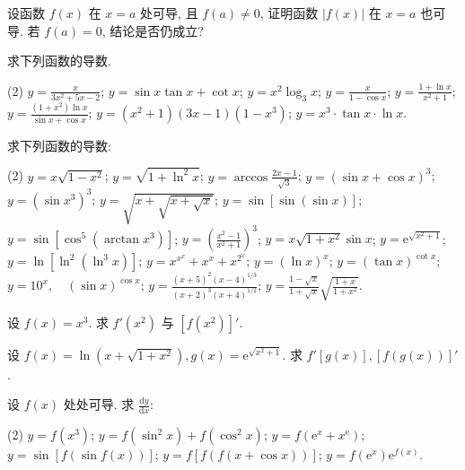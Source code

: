 \begin{exercise}[3.1.5]
    设函数 $f(x)$ 在 $x=a$ 处可导, 且 $f(a) \ne 0$, 证明函数 $|f(x)|$ 在 $x=a$ 也可导. 若 $f(a)=0$, 结论是否仍成立?
\end{exercise}

\begin{exercise}[3.1.6]
    求下列函数的导数.
    \begin{tasks}[label=(\arabic*)](2)
        \task $y = \frac{x}{3x^2+5x-2}$;
        \task $y = \sin x \tan x + \cot x$;
        \task $y = x^2 \log_3 x$;
        \task $y = \frac{x}{1-\cos x}$;
        \task $y = \frac{1+\ln x}{x^2+1}$;
        \task $y = \frac{(1+x^2)\ln x}{\sin x + \cos x}$;
        \task $y = (x^2+1)(3x-1)(1-x^3)$;
        \task $y = x^3 \cdot \tan x \cdot \ln x$.
    \end{tasks}
\end{exercise}

\begin{exercise}[3.1.7]
    求下列函数的导数:
    \begin{tasks}[label=(\arabic*)](2)
        \task $y = x\sqrt{1-x^2}$;
        \task $y = \sqrt{1+\ln^2 x}$;
        \task $y = \arccos\frac{2x-1}{\sqrt{3}}$;
        \task $y = (\sin x + \cos x)^3$;
        \task $y = (\sin x^3)^3$;
        \task $y = \sqrt{x+\sqrt{x+\sqrt{x}}}$;
        \task $y = \sin[\sin(\sin x)]$;
        \task $y = \sin[\cos^5(\arctan x^3)]$;
        \task $y = \left(\frac{x^2-1}{x^2+1}\right)^3$;
        \task $y = x\sqrt{1+x^2}\sin x$;
        \task $y = \mathrm{e}^{\sqrt{x^2+1}}$;
        \task $y = \ln[\ln^2(\ln^3 x)]$;
        \task $y = x^{x^x}+x^{x}+x^{2^x}$;
        \task $y = (\ln x)^x$;
        \task $y = (\tan x)^{\cot x}$;
        \task $y = 10^x, \quad (\sin x)^{\cos x}$;
        \task $y = \frac{(x+5)^2(x-4)^{1/3}}{(x+2)^3(x+4)^{1/2}}$;
        \task $y = \frac{1-\sqrt{x}}{1+\sqrt{x}}\sqrt{\frac{1+x}{1+x^2}}$.
    \end{tasks}
\end{exercise}

\begin{exercise}[3.1.8]
    设 $f(x)=x^3$. 求 $f'(x^2)$ 与 $[f(x^2)]'$.
\end{exercise}

\begin{exercise}[3.1.9]
    设 $f(x)=\ln(x+\sqrt{1+x^2}), g(x)=\mathrm{e}^{\sqrt{x^2+1}}$. 求 $f'[g(x)], [f(g(x))]'$.
\end{exercise}

\begin{exercise}[3.1.10]
    设 $f(x)$ 处处可导. 求 $\frac{\mathrm{d}y}{\mathrm{d}x}$:
    \begin{tasks}[label=(\arabic*)](2)
        \task $y = f(x^3)$;
        \task $y = f(\sin^2 x) + f(\cos^2 x)$;
        \task $y = f(\mathrm{e}^x+x^{\mathrm{e}})$;
        \task $y = \sin[f(\sin f(x))]$;
        \task $y = f[f(f(x+\cos x))]$;
        \task $y = f(\mathrm{e}^x) \mathrm{e}^{f(x)}$.
    \end{tasks}
\end{exercise}

